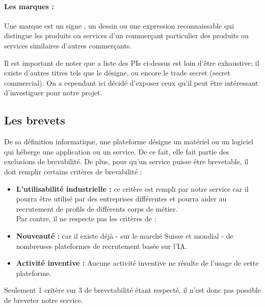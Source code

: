 \paragraph{Les marques :} Une marque est un signe , un dessin ou une expression reconnaissable qui distingue les produits ou services d'un commerçant particulier des produits ou services similaires d'autres commerçants.\newline

Il est important de noter que a liste des PIs ci-dessus est loin d'être exhaustive; il existe d’autres titres tels que le désigne, ou encore le trade secret (secret commercial). On a cependant ici décidé d'exposer ceux qu'il peut être intéressant d'investiguer pour notre projet. 

\newpage

\subsection{Les brevets}
 
De sa définition informatique, une plateforme désigne un matériel ou un logiciel qui héberge une application ou un service. De ce fait, elle fait partie des exclusions de brevabilité. De plus, pour qu'un service puisse être brevetable, il doit remplir certains critères de brevabilité :\newline

 \begin{itemize}
     \item \textbf{L'utilisabilité industrielle :} ce critère est rempli par notre service car il pourra être utilisé par des entreprises différentes et pourra aider au recrutement de profils de différents corps de métier. \\
     Par contre, il ne respecte pas les critères de :\\
     \item \textbf{Nouveauté :} car il existe déjà - sur le marché Suisse et mondial - de nombreuses plateformes de recrutement basée sur l'IA.\\
     \item \textbf{Activité inventive :} Aucune activité inventive ne résulte de l'usage de cette plateforme. \\
 \end{itemize}
 
Seulement 1 critère sur 3 de brevetabilité étant respecté, il n'est donc pas possible de breveter notre service.

